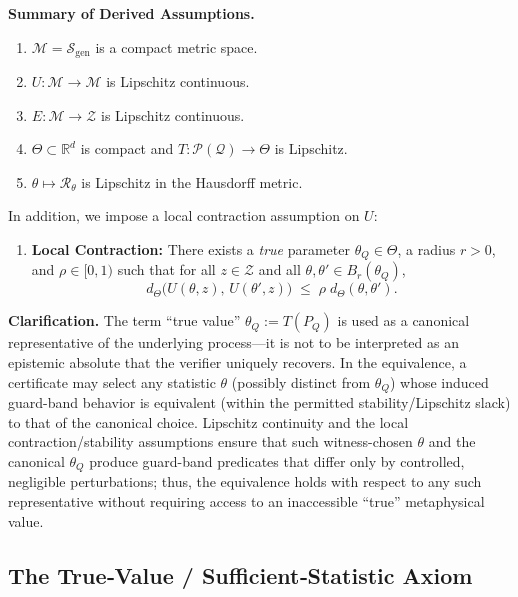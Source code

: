 \documentclass[12pt]{article}
\theoremstyle{definition}
\theoremstyle{plain}
\begin{document}
\medskip\noindent
\textbf{Summary of Derived Assumptions.}
\begin{enumerate}[label=(A\arabic*)]
  \item \(\mathcal M = \mathcal S_{\mathrm{gen}}\) is a compact metric space.
  \item \(U:\mathcal M\to\mathcal M\) is Lipschitz continuous.
  \item \(E:\mathcal M\to\mathcal Z\) is Lipschitz continuous.
  \item \(\Theta\subset\mathbb{R}^d\) is compact and \(T:\mathcal P(\mathcal Q)\to\Theta\) is Lipschitz.
  \item \(\theta\mapsto\mathcal R_{\theta}\) is Lipschitz in the Hausdorff metric.
\end{enumerate}

In addition, we impose a local contraction assumption on $U$:
\begin{enumerate}[label=(A\arabic*), start=6]
\item \textbf{Local Contraction:} There exists a \emph{true} parameter $\theta_Q\in\Theta$, a radius $r>0$, and $\rho\in[0,1)$ such that for all $z\in\mathcal Z$ and all $\theta,\theta'\in B_r(\theta_Q)$,
    \[
      d_\Theta\bigl(U(\theta,z),\,U(\theta',z)\bigr)
      \;\le\;\rho\;d_\Theta(\theta,\theta').
    \]
\end{enumerate}
\noindent\textbf{Clarification.} The term ``true value'' $\theta_Q := T(P_Q)$ is used as a canonical representative of the underlying process—it is not to be interpreted as an epistemic absolute that the verifier uniquely recovers. In the equivalence, a certificate may select any statistic $\theta$ (possibly distinct from $\theta_Q$) whose induced guard-band behavior is equivalent (within the permitted stability/Lipschitz slack) to that of the canonical choice. Lipschitz continuity and the local contraction/stability assumptions ensure that such witness-chosen $\theta$ and the canonical $\theta_Q$ produce guard-band predicates that differ only by controlled, negligible perturbations; thus, the equivalence holds with respect to any such representative without requiring access to an inaccessible “true” metaphysical value.


\subsection{The True‐Value / Sufficient‐Statistic Axiom}
\end{document}
